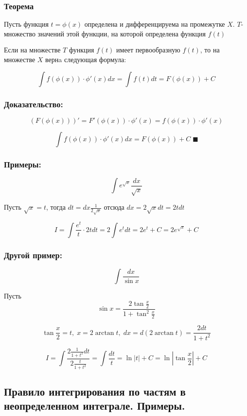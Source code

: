 \documentclass[a4paper,12pt]{article}
\theoremstyle{plain} %
\theoremstyle{definition} %
\theoremstyle{remark} %
\begin{document}
\subsubsection*{Теорема}
Пусть функция $t = \phi(x)$ определена и дифференцируема на промежутке $X$. $T$- множество значений этой функции, на которой определена функция $f(t)$

Если на множестве $T$ функция $f(t)$ имеет первообразную $f(t)$, то на множестве $X$ вернa следующая формула:

\[
	\int f(\phi(x)) \cdot \phi'(x) dx = \int f(t) dt = F(\phi(x)) + C
\]

\subsubsection*{Доказательство:}
\[
	(F(\phi(x)))' = F'(\phi(x)) \cdot \phi'(x) = f(\phi(x)) \cdot \phi'(x)
\]

\[
	\int f(\phi(x)) \cdot \phi'(x) dx = F(\phi(x)) + C \; \blacksquare
\]

\subsubsection*{Примеры:}

\[
	\int e^{\sqrt{x}} \frac{dx}{\sqrt{x}}
\]

Пусть $\sqrt{x} = t$, тогда $dt = dx \frac{1}{2\sqrt{x}}$ отсюда $dx = 2\sqrt{x} dt = 2t dt$

\[
	I = \int \frac{e^t}{t} \cdot 2tdt = 2 \int e^t dt = 2e^t + C = 2 e^{\sqrt{x}} + C
\]

\subsubsection*{Другой пример:}

\[
	\int \frac{dx}{\sin x}
\]

Пусть
\[
	\sin x = \frac{2 \tan{ \frac{x}{2}}}{1 + \tan^2{\frac{x}{2}}}
\]

\[
	\tan \frac{x}{2} = t, \; x = 2\arctan t, \; dx = d(2 \arctan t) = \frac{2dt}{1 + t^2}
\]

\[
	I = \int \frac{ 2 \frac{1}{1 + t^2} dt }{ 2 \frac{t}{1 + t^2} } = \int \frac{dt}{t} = \ln |t| + C = \ln | \tan \frac{x}{2} | + C
\]


\newpage
\subsection*{Правило интегрирования по частям в неопределенном интеграле. Примеры.}
\end{document}
